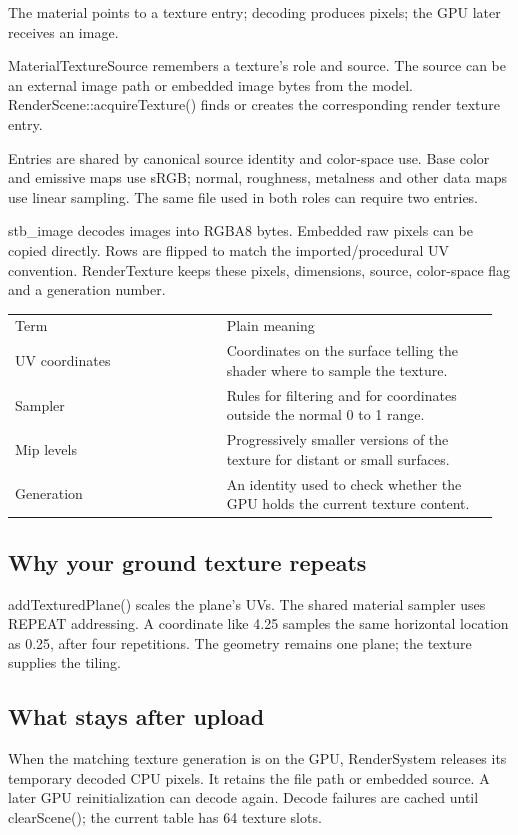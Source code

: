 \documentclass[11pt,a4paper]{article}
\begin{document}
\label{core-32}
The material points to a texture entry; decoding produces pixels; the GPU later receives an image.

MaterialTextureSource remembers a texture's role and source. The source can be an external image path or embedded image bytes from the model. RenderScene::acquireTexture() finds or creates the corresponding render texture entry.

Entries are shared by canonical source identity and color-space use. Base color and emissive maps use sRGB; normal, roughness, metalness and other data maps use linear sampling. The same file used in both roles can require two entries.

stb\_image decodes images into RGBA8 bytes. Embedded raw pixels can be copied directly. Rows are flipped to match the imported/procedural UV convention. RenderTexture keeps these pixels, dimensions, source, color-space flag and a generation number.

{\small
\begin{longtable}{@{}p{0.42\linewidth}p{0.54\linewidth}@{}}
Term & Plain meaning \\
UV coordinates & Coordinates on the surface telling the shader where to sample the texture. \\
Sampler & Rules for filtering and for coordinates outside the normal 0 to 1 range. \\
Mip levels & Progressively smaller versions of the texture for distant or small surfaces. \\
Generation & An identity used to check whether the GPU holds the current texture content. \\
\end{longtable}
}

\subsection*{Why your ground texture repeats}
addTexturedPlane() scales the plane's UVs. The shared material sampler uses REPEAT addressing. A coordinate like 4.25 samples the same horizontal location as 0.25, after four repetitions. The geometry remains one plane; the texture supplies the tiling.

\subsection*{What stays after upload}
When the matching texture generation is on the GPU, RenderSystem releases its temporary decoded CPU pixels. It retains the file path or embedded source. A later GPU reinitialization can decode again. Decode failures are cached until clearScene(); the current table has 64 texture slots.
\end{document}
